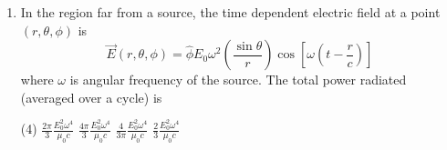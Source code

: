 \begin{enumerate}
	{}
	\begin{tasks}(4)
		\task[\textbf{a.}]$\frac{\mu_{0} e^{2} u^{2}}{3 \pi m c^{2} s}$
		\task[\textbf{b.}]$\frac{\mu_{0} e^{2} u^{2}}{6 \pi m c^{2} s}$
		\task[\textbf{c.}]$\frac{\mu_{0} e^{2} u}{8 \pi m c s}$
		\task[\textbf{d.}] $\frac{\mu_{0} e^{2} u}{16 \pi m c s}$
	\end{tasks}
\begin{answer}
	\begin{align*}
	\text{Total power radiated }P&=\frac{\mu_{0} q^{2} a^{2}}{6 \pi c}\\
	\text{Total energy radiated in time $t$ is }E&=P \cdot t=\frac{\mu_{0} e^{2} a^{2}}{6 \pi c} \cdot t=\frac{\mu_{0} e^{2} a^{2}}{6 \pi c} \times \frac{u}{2 a}\\
	&\left[\because v=u-a t \Rightarrow \frac{u}{2}=u-a t \Rightarrow t=\frac{u}{2 a}\right]\\
	\Rightarrow E&=\frac{\mu_{0} e^{2} a u}{12 \pi c}\\
	\text{Fraction of initial $K . E .$ lost due to radiation }&=\frac{E}{\frac{1}{2} m u^{2}}=\frac{2 E}{m u^{2}}\\
	&=\frac{2}{m u^{2}} \times \frac{\mu_{0} e^{2} a u}{12 \pi c}=\frac{\mu_{0} e^{2} a}{6 \pi m c u}
	\intertext{$\left[\therefore s=u t-\frac{1}{2} a t^{2}=u \times \frac{u}{2 a}-\frac{1}{2} a \times \frac{u^{2}}{4 a^{2}}=\frac{u^{2}}{2 a}-\frac{u^{2}}{8 a}=\frac{3 u^{2}}{8 a} \Rightarrow a=\frac{3 u^{2}}{8 s}\right]$}
	&=\frac{\mu_{0} e^{2}}{6 \pi m c u} \times \frac{3 u^{2}}{8 s}=\frac{\mu_{0} e^{2} u}{16 \pi m c s}
	\end{align*}
	So the correct answer is \textbf{Option (d)}
\end{answer}
	\item  In the region far from a source, the time dependent electric field at a point $(r, \theta, \phi)$ is
	$$
	\vec{E}(r, \theta, \phi)=\hat{\phi} E_{0} \omega^{2}\left(\frac{\sin \theta}{r}\right) \cos \left[\omega\left(t-\frac{r}{c}\right)\right]
	$$
	where $\omega$ is angular frequency of the source. The total power radiated (averaged over a cycle) is
	{}
	\begin{tasks}(4)
		\task[\textbf{a.}]$\frac{2 \pi}{3} \frac{E_{0}^{2} \omega^{4}}{\mu_{0} c}$
		\task[\textbf{b.}]$\frac{4 \pi}{3} \frac{E_{0}^{2} \omega^{4}}{\mu_{0} c}$
		\task[\textbf{c.}] $\frac{4}{3 \pi} \frac{E_{0}^{2} \omega^{4}}{\mu_{0} c}$
		\task[\textbf{d.}] $\frac{2}{3} \frac{E_{0}^{2} \omega^{4}}{\mu_{0} c}$
	\end{tasks}

\end{enumerate}
